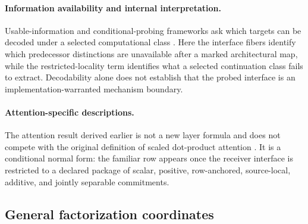 \paragraph{Information availability and internal interpretation.}
Usable-information and conditional-probing frameworks ask which targets can be decoded under a selected computational class \citep{xu2020usable,hewitt2021conditional}. Here the interface fibers identify which predecessor distinctions are unavailable after a marked architectural map, while the restricted-locality term identifies what a selected continuation class fails to extract. Decodability alone does not establish that the probed interface is an implementation-warranted mechanism boundary.

\paragraph{Attention-specific descriptions.}
The attention result derived earlier is not a new layer formula and does not compete with the original definition of scaled dot-product attention \citep{vaswani2017attention}. It is a conditional normal form: the familiar row appears once the receiver interface is restricted to a declared package of scalar, positive, row-anchored, source-local, additive, and jointly separable commitments.

\subsection{General factorization coordinates}

